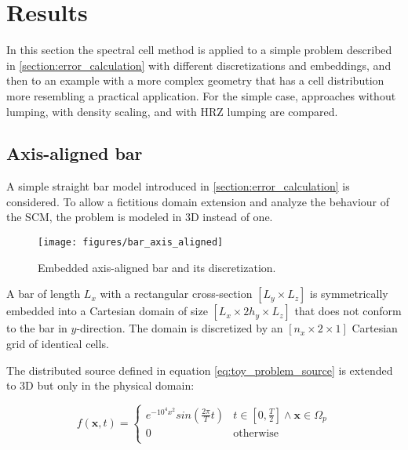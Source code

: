 %
\section{Results}
\label{section:results}
%

In this section the spectral cell method is applied to a simple problem described in \ref{section:error_calculation} with different discretizations and embeddings, and then to an example with a more complex geometry that has a cell distribution more resembling a practical application. For the simple case, approaches without lumping, with density scaling, and with HRZ lumping are compared.

%
\subsection{Axis-aligned bar}
\label{section:axis_aligned_bar}
%

A simple straight bar model introduced in \ref{section:error_calculation} is considered. To allow a fictitious domain extension and analyze the behaviour of the SCM, the problem is modeled in 3D instead of one.

\begin{figure}[h]
	\centering
	\texttt{[image: figures/bar\_axis\_aligned]}
	\caption{Embedded axis-aligned bar and its discretization.}
	\label{fig:bar_axis_aligned}
\end{figure}

A bar of length $L_x$ with a rectangular cross-section $[L_y \times L_z]$ is symmetrically embedded into a Cartesian domain of size $[L_x \times 2h_y \times L_z]$ that does not conform to the bar in $y$-direction. The domain is discretized by an $[n_x \times 2 \times 1]$ Cartesian grid of identical cells.

The distributed source defined in equation \ref{eq:toy_problem_source} is extended to 3D but only in the physical domain:

\begin{equation} \label{eq:axis_aligned_source}
	f(\mathbf x,t) = \begin{cases}
	e^{-10^4x^2} sin \left( \frac{2 \pi}{T} t \right) & t \in \left[ 0,\frac{T}{2} \right] \land \mathbf x \in \Omega_p \\[0.5em]
	0 & \text{otherwise} \\
	\end{cases}
\end{equation}

